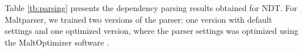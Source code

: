 \documentclass[11pt,a4paper]{article}
\begin{document}



Table \ref{tb:parsing} presents the dependency parsing results
obtained for NDT.  For Maltparser, we trained two versions of the
parser: one version with default settings and one optimized version,
where the parser settings was optimized using the MaltOptimizer
software . 

\clearpage

\end{document}

